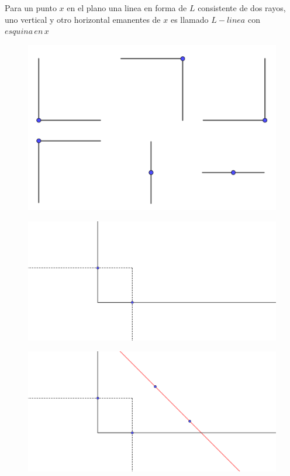 \documentclass{beamer}
\begin{document}
\begin{frame}
Para un punto $x$ en el plano una linea en forma de $L$ consistente de dos rayos, uno vertical y otro horizontal emanentes de $x$ es llamado $L-linea$ con $esquina \, en \, x$
\end{frame}
\begin{frame}
\begin{figure}[h]
\includegraphics[width=\textwidth]{L-lineas}
\end{figure}
\end{frame}
\begin{frame}
\begin{figure}[h]
\includegraphics[width=\textwidth]{Diferencia-de-lineas-y-L-lineas}
\end{figure}
\end{frame}
\begin{frame}
\begin{figure}[h]
\includegraphics[width=\textwidth]{Diferencia-de-lineas-y-L-lineas-2}
\end{figure}
\end{frame}
\end{document}
